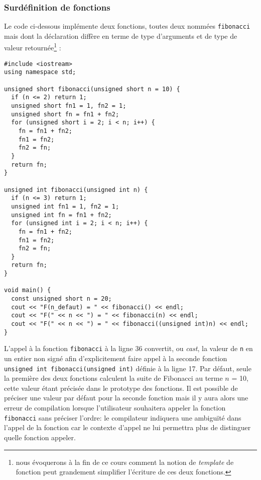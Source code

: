 \documentclass{book}
\begin{document}
\begin{correction}
\subsubsection{Surdéfinition de fonctions}
Le code ci-dessous implémente deux fonctions, toutes deux nommées \texttt{fibonacci} mais
dont la déclaration diffère en terme de type d'arguments et de type de valeur
retournée\footnote{nous évoquerons à la fin de ce cours comment la notion de \emph{template} de
fonction peut grandement simplifier l'écriture de ces deux fonctions.} :

\begin{verbatim}
#include <iostream>
using namespace std;

unsigned short fibonacci(unsigned short n = 10) {
  if (n <= 2) return 1;
  unsigned short fn1 = 1, fn2 = 1;
  unsigned short fn = fn1 + fn2;
  for (unsigned short i = 2; i < n; i++) {
    fn = fn1 + fn2;
    fn1 = fn2;
    fn2 = fn;
  }
  return fn;
}

unsigned int fibonacci(unsigned int n) {
  if (n <= 3) return 1;
  unsigned int fn1 = 1, fn2 = 1;
  unsigned int fn = fn1 + fn2;
  for (unsigned int i = 2; i < n; i++) {
    fn = fn1 + fn2;
    fn1 = fn2;
    fn2 = fn;
  }
  return fn;
}

void main() {
  const unsigned short n = 20;
  cout << "F(n_defaut) = " << fibonacci() << endl;
  cout << "F(" << n << ") = " << fibonacci(n) << endl;
  cout << "F(" << n << ") = " << fibonacci((unsigned int)n) << endl;
}
\end{verbatim}

L'appel à la fonction \texttt{fibonacci} à la ligne 36 convertit, ou \emph{cast}, la valeur de \texttt{n}
en un entier non signé afin d'explicitement faire appel à la seconde fonction
\texttt{unsigned int fibonacci(unsigned int)} définie à la ligne 17. Par défaut, seule la
première des deux fonctions calculent la suite de Fibonacci au terme \(n\) = 10,
cette valeur étant précisée dans le prototype des fonctions. Il est possible de
préciser une valeur par défaut pour la seconde fonction mais il y aura alors une
erreur de compilation lorsque l'utilisateur souhaitera appeler la fonction
\texttt{fibonacci} sans préciser l'ordre: le compilateur indiquera une ambiguïté dans
l'appel de la fonction car le contexte d'appel ne lui permettra plus de
distinguer quelle fonction appeler.


\end{correction}
\end{document}
